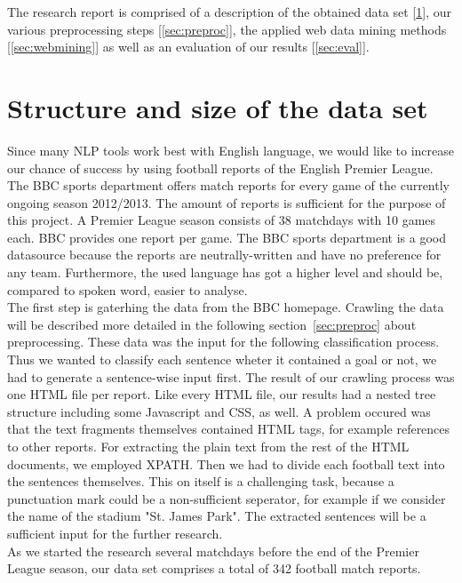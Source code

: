\documentclass[11pt,titlepage,oneside,openany]{book}
\begin{document}
The research report is comprised of a description of the obtained data set [\ref{sec:structure}], our various preprocessing steps [\ref{sec:preproc}], the applied web data mining methods [\ref{sec:webmining}] as well as an evaluation of our results [\ref{sec:eval}].

\section{Structure and size of the data set}
\label{sec:structure}

Since many NLP tools work best with English language, we would like to increase our chance of success by using football reports of the English Premier League. The BBC sports department offers match reports for every game of the currently ongoing season 2012/2013. The amount of reports is sufficient for the purpose of this project. A Premier League season consists of 38 matchdays with 10 games each. BBC provides one report per game. The BBC sports department is a good datasource because the reports are neutrally-written and have no preference for any team. Furthermore, the used language has got a higher level and should be, compared to spoken word, easier to analyse. \\

The first step is gaterhing the data from the BBC homepage. Crawling the data will be described more detailed in the following section~\ref{sec:preproc} about preprocessing. These data was the input for the following classification process. Thus we wanted to classify each sentence wheter it contained a goal or not, we had to generate a sentence-wise input first.  The result of our crawling process was one HTML file per report. Like every HTML file, our results had a nested tree structure including some Javascript and CSS, as well. A problem occured was that the text fragments themselves contained HTML tags, for example references to other reports. For extracting the plain text from the rest of the HTML documents, we employed XPATH. Then we had to divide each football text into the sentences themselves. This on itself is a challenging task, because a punctuation mark could be a non-sufficient seperator, for example if we consider the name of the stadium "St. James Park". The extracted sentences will be a sufficient input for the further research.\\

As we started the research several matchdays before the end of the Premier League season, our data set comprises a total of 342 football match reports.
\end{document}
